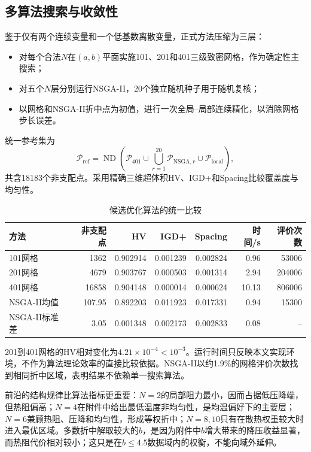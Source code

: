 \documentclass[UTF8,12pt,a4paper]{ctexart}
\newcommand{\ND}{\operatorname{ND}}
\begin{document}
\subsection{多算法搜索与收敛性}
鉴于仅有两个连续变量和一个低基数离散变量，正式方法压缩为三层：
\begin{itemize}
  \item 对每个合法$N$在$(a,b)$平面实施101、201和401三级致密网格，作为确定性主搜索；
  \item 对五个$N$层分别运行NSGA-II，20个独立随机种子用于随机复核；
  \item 以网格和NSGA-II折中点为初值，进行一次全局--局部连续精化，以消除网格步长误差。
\end{itemize}
统一参考集为
\begin{equation}
\mathcal P_{\mathrm{ref}}=\ND\!\left(\mathcal P_{401}\cup
\bigcup_{r=1}^{20}\mathcal P_{\mathrm{NSGA},r}\cup\mathcal P_{\mathrm{local}}\right),
\end{equation}
共含18183个非支配点。采用精确三维超体积HV、IGD+和Spacing比较覆盖度与均匀性。

\begin{table}[H]\centering\small
\caption{候选优化算法的统一比较}
\begin{tabular}{lrrrrrr}
\toprule
方法&非支配点&HV&IGD+&Spacing&时间/s&评价次数\\\midrule
101网格&1362&0.902914&0.001239&0.002824&0.96&53006\\
201网格&4679&0.903767&0.000503&0.001314&2.94&204006\\
401网格&16858&0.904148&0.000014&0.000624&10.13&806006\\
NSGA-II均值&107.95&0.892203&0.011923&0.017331&0.94&15300\\
NSGA-II标准差&3.05&0.001348&0.002173&0.002833&0.08&--\\
\bottomrule
\end{tabular}
\end{table}
201到401网格的HV相对变化为$4.21\times10^{-4}<10^{-3}$。运行时间只反映本文实现环境，不作为算法理论效率的直接比较依据。NSGA-II以约1.9\%的网格评价次数找到相同折中区域，表明结果不依赖单一搜索算法。

前沿的结构规律比算法指标更重要：$N=2$的局部阻力最小，因而占据低压降端，但热阻偏高；$N=4$在附件中给出最低温度非均匀性，是均温偏好下的主要层；$N=6$兼顾热阻、压降和均匀性，形成等权折中；$N=8,10$只有在散热权重较大时进入最优区域。多数折中解取较大的$b$，是因为附件中$b$增大带来的降压收益显著，而热阻代价相对较小；这只是在$b\le4.5$数据域内的权衡，不能向域外延伸。
\end{document}
